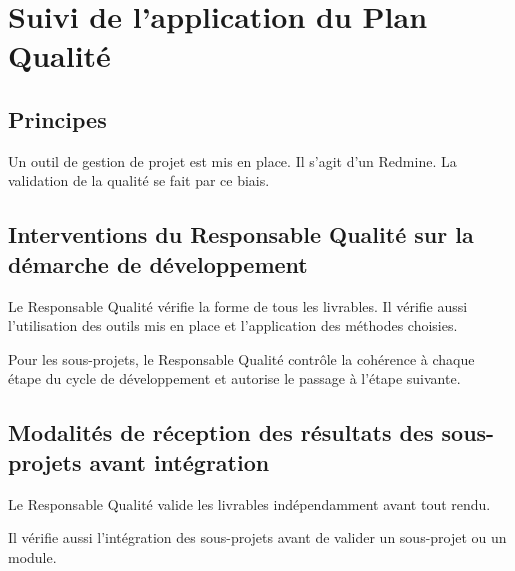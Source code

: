\section{Suivi de l'application du Plan Qualité}

\subsection{Principes}
Un outil de gestion de projet est mis en place. Il s'agit d'un Redmine.
La validation de la qualité se fait par ce biais.

\subsection{Interventions du Responsable Qualité sur la démarche de développement}
Le Responsable Qualité vérifie la forme de tous les livrables. Il vérifie aussi 
l'utilisation des outils mis en place et l'application des méthodes choisies.

Pour les sous-projets, le Responsable Qualité contrôle la cohérence à chaque 
étape du cycle de développement et autorise le passage à l'étape suivante.

\subsection{Modalités de réception des résultats des sous-projets avant intégration}
Le Responsable Qualité valide les livrables indépendamment avant tout rendu.

Il vérifie aussi l'intégration des sous-projets avant de valider un sous-projet 
ou un module.

